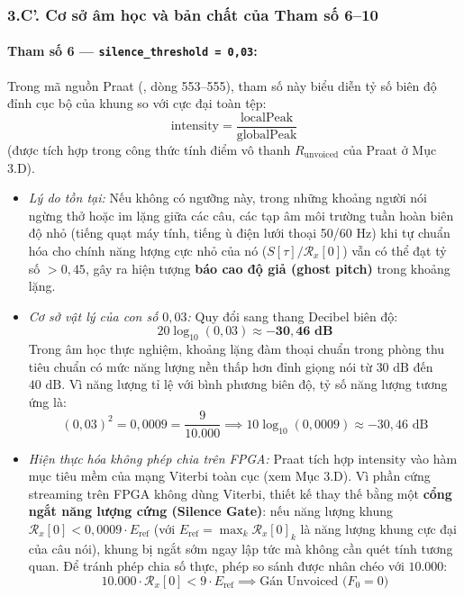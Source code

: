 \documentclass[11pt,a4paper]{article}
\begin{document}
\subsubsection*{3.C'. Cơ sở âm học và bản chất của Tham số 6--10}

\paragraph{Tham số 6 --- \texttt{silence\_threshold = 0,03}:}
Trong mã nguồn Praat (, dòng 553--555), tham số này biểu diễn tỷ số biên độ đỉnh cục bộ của khung so với cực đại toàn tệp:
\[
\text{intensity} = \frac{\text{localPeak}}{\text{globalPeak}}
\]
(được tích hợp trong công thức tính điểm vô thanh $R_{\text{unvoiced}}$ của Praat ở Mục 3.D).
\begin{itemize}
    \setlength{\itemsep}{1pt}
    \item \emph{Lý do tồn tại:} Nếu không có ngưỡng này, trong những khoảng người nói ngừng thở hoặc im lặng giữa các câu, các tạp âm môi trường tuần hoàn biên độ nhỏ (tiếng quạt máy tính, tiếng ù điện lưới thoại 50/60 Hz) khi tự chuẩn hóa cho chính năng lượng cực nhỏ của nó ($S[\tau] / \mathcal{R}_x[0]$) vẫn có thể đạt tỷ số $> 0{,}45$, gây ra hiện tượng \textbf{báo cao độ giả (ghost pitch)} trong khoảng lặng.
    \item \emph{Cơ sở vật lý của con số $0{,}03$:} Quy đổi sang thang Decibel biên độ:
    \[
    20 \log_{10}(0{,}03) \approx \mathbf{-30{,}46\text{ dB}}
    \]
    Trong âm học thực nghiệm, khoảng lặng đàm thoại chuẩn trong phòng thu tiêu chuẩn có mức năng lượng nền thấp hơn đỉnh giọng nói từ $30\text{ dB}$ đến $40\text{ dB}$. Vì năng lượng tỉ lệ với bình phương biên độ, tỷ số năng lượng tương ứng là:
    \[
    (0{,}03)^2 = 0{,}0009 = \frac{9}{10.000} \implies 10 \log_{10}(0{,}0009) \approx -30{,}46\text{ dB}
    \]
    \item \emph{Hiện thực hóa không phép chia trên FPGA:} Praat tích hợp $\text{intensity}$ vào hàm mục tiêu mềm của mạng Viterbi toàn cục (xem Mục 3.D). Vì phần cứng streaming trên FPGA không dùng Viterbi, thiết kế thay thế bằng một \textbf{cổng ngắt năng lượng cứng (Silence Gate)}: nếu năng lượng khung $\mathcal{R}_x[0] < 0{,}0009 \cdot E_{\text{ref}}$ (với $E_{\text{ref}} = \max_k \mathcal{R}_x[0]_k$ là năng lượng khung cực đại của câu nói), khung bị ngắt sớm ngay lập tức mà không cần quét tính tương quan. Để tránh phép chia số thực, phép so sánh được nhân chéo với $10.000$:
    \begin{equation}
    10.000 \cdot \mathcal{R}_x[0] < 9 \cdot E_{\text{ref}} \implies \text{Gán Unvoiced ($F_0 = 0$)}
    \label{eq:silence_gate_integer}
    \end{equation}
\end{itemize}
\end{document}

